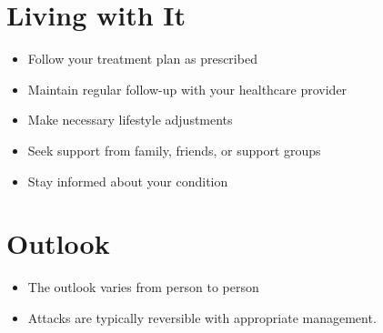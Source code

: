 \section{Living with It}
\begin{itemize}[noitemsep]
  \item Follow your treatment plan as prescribed
  \item Maintain regular follow-up with your healthcare provider
  \item Make necessary lifestyle adjustments
  \item Seek support from family, friends, or support groups
  \item Stay informed about your condition
\end{itemize}
\section{Outlook}
\begin{itemize}[noitemsep]
  \item The outlook varies from person to person
  \item Attacks are typically reversible with appropriate management.
\end{itemize}
